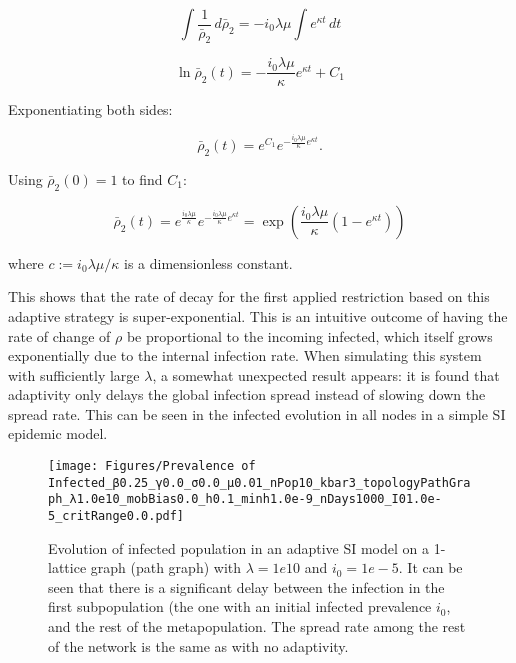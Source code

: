 \begin{equation}
\int \frac{1}{\bar \rho_{2}} \, d\bar \rho_{2} = - i_{0} \lambda \mu \int e^{\kappa t} \, dt
\end{equation}

\begin{equation}
\ln \bar \rho_{2}(t) = - \frac{i_{0} \lambda \mu}{\kappa} e^{\kappa t} + C_1
\end{equation}

Exponentiating both sides:

\begin{equation}
\bar \rho_{2}(t) = e^{C_1} e^{-\frac{i_{0} \lambda \mu}{\kappa} e^{\kappa t}}.
\end{equation}

Using $\bar \rho_{2}(0) = 1$ to find $C_1$:

\begin{equation}
\bar \rho_{2}(t) = e^{\frac{i_{0} \lambda \mu}{\kappa}} e^{-\frac{i_{0} \lambda \mu}{\kappa} e^{\kappa t}}
 = \exp\left(\frac{i_{0} \lambda \mu}{\kappa} \left( 1 - e^{\kappa t} \right)\right) 
\end{equation}

where $c := i_{0} \lambda \mu / \kappa$ is a dimensionless constant.

This shows that the rate of decay for the first applied restriction based on this adaptive strategy is super-exponential. This is an intuitive outcome of having the rate of change of $\rho$ be proportional to the incoming infected, which itself grows exponentially due to the internal infection rate. When simulating this system with sufficiently large $\lambda$, a somewhat unexpected result appears: it is found that adaptivity only delays the global infection spread instead of slowing down the spread rate. This can be seen in the infected evolution in all nodes in a simple SI epidemic model.

\begin{figure}[!ht]
    \centering
    \texttt{[image: Figures/Prevalence of Infected\_β0.25\_γ0.0\_σ0.0\_μ0.01\_nPop10\_kbar3\_topologyPathGraph\_λ1.0e10\_mobBias0.0\_h0.1\_minh1.0e-9\_nDays1000\_I01.0e-5\_critRange0.0.pdf]}
    \caption{\small Evolution of infected population in an adaptive SI model on a 1-lattice graph 
    (path graph) with $\lambda = 1e10$ and $i_0 = 1e-5$. It can be seen that there is a significant 
    delay between the infection in the first subpopulation (the one with an initial infected prevalence $i_0$, and the rest of the metapopulation. The spread rate among the rest of the network is the same as with no adaptivity.}
\end{figure}

